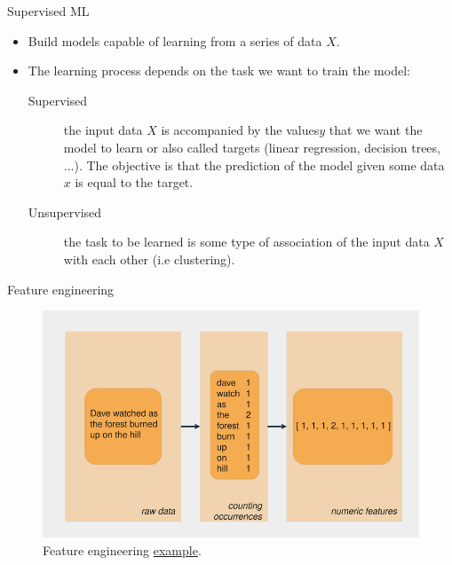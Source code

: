 \documentclass{beamer}
\begin{document}
\begin{frame}{Supervised ML\cite{kroese2020}}
    \begin{itemize}
        \item Build models capable of learning from a series of data $X$.
        \item The learning process depends on the task we want to train the model:
            \begin{description}
                \item[Supervised] the input data $X$ is accompanied by the values ​$​y$ that we want the model to learn or also called targets (linear regression, decision trees, ...). The objective is that the prediction of the model given some data $x$ is equal to the target. 
                \item[Unsupervised] the task to be learned is some type of association of the input data $X$ with each other (i.e clustering).
            \end{description}
        \end{itemize}
\end{frame}


\begin{frame}{Feature engineering}
    \begin{figure}
        \includegraphics[width=0.9\linewidth]{FeatureEngineering}
        \caption{Feature engineering \href{https://realpython.com/python-ai-neural-network/}{example}.}
        \label{Fig:FeatureEngineering}
    \end{figure}
\end{frame}
\end{document}
